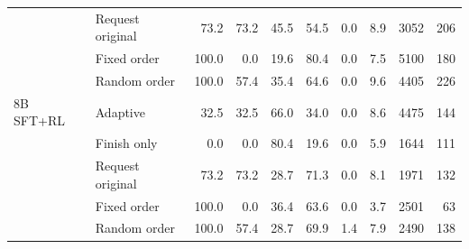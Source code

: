\begin{table}[t]
\begin{minipage}{.94\textwidth}
\begin{tabular}{@{}llrrrrrrrr@{}}
 & Request original & 73.2 & 73.2 & 45.5 & 54.5 & 0.0 & 8.9 & 3052 & 206\\
 & Fixed order & 100.0 & 0.0 & 19.6 & 80.4 & 0.0 & 7.5 & 5100 & 180\\
 & Random order & 100.0 & 57.4 & 35.4 & 64.6 & 0.0 & 9.6 & 4405 & 226\\
\midrule
8B SFT+RL & Adaptive & 32.5 & 32.5 & 66.0 & 34.0 & 0.0 & 8.6 & 4475 & 144\\
 & Finish only & 0.0 & 0.0 & 80.4 & 19.6 & 0.0 & 5.9 & 1644 & 111\\
 & Request original & 73.2 & 73.2 & 28.7 & 71.3 & 0.0 & 8.1 & 1971 & 132\\
 & Fixed order & 100.0 & 0.0 & 36.4 & 63.6 & 0.0 & 3.7 & 2501 & 63\\
 & Random order & 100.0 & 57.4 & 28.7 & 69.9 & 1.4 & 7.9 & 2490 & 138\\
\bottomrule
\end{tabular}\end{minipage}\end{table}
